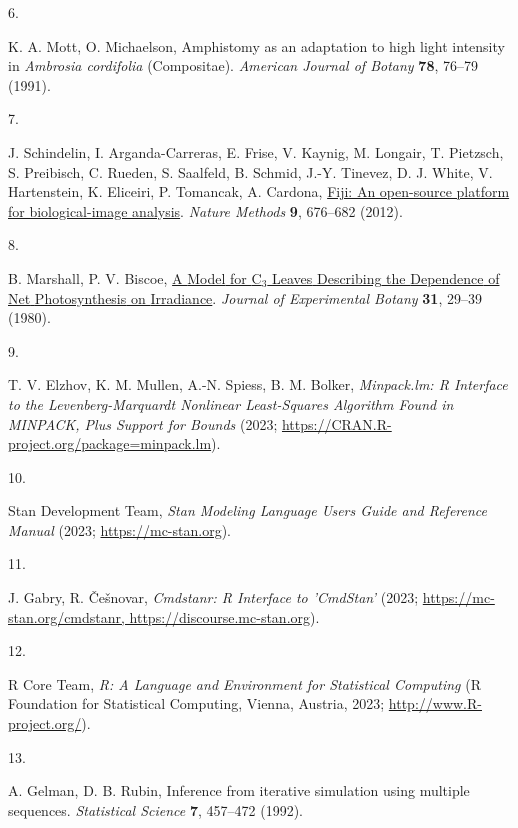 \documentclass[
  letterpaper,
  DIV=11,
  numbers=noendperiod]{scrartcl}
\newlength{\cslhangindent}
\newlength{\csllabelwidth}
\newenvironment{CSLReferences}[2] %
 {\begin{list}{}{%
  \setlength{\itemindent}{0pt}
  \setlength{\leftmargin}{0pt}
  \setlength{\parsep}{0pt}
  \ifodd #1
   \setlength{\leftmargin}{\cslhangindent}
   \setlength{\itemindent}{-1\cslhangindent}
  \fi
  \setlength{\itemsep}{#2\baselineskip}}}
 {\end{list}}
\newcommand{\CSLLeftMargin}[1]{\parbox[t]{\csllabelwidth}{\strut#1\strut}}
\newcommand{\CSLRightInline}[1]{\parbox[t]{\linewidth - \csllabelwidth}{\strut#1\strut}}
\begin{document}
\begin{CSLReferences}{0}{1}
\CSLLeftMargin{6. }%
\CSLRightInline{K. A. Mott, O. Michaelson, Amphistomy as an adaptation
to high light intensity in \emph{{Ambrosia} cordifolia} ({Compositae}).
\emph{American Journal of Botany} \textbf{78}, 76--79 (1991).}

\CSLLeftMargin{7. }%
\CSLRightInline{J. Schindelin, I. Arganda-Carreras, E. Frise, V. Kaynig,
M. Longair, T. Pietzsch, S. Preibisch, C. Rueden, S. Saalfeld, B.
Schmid, J.-Y. Tinevez, D. J. White, V. Hartenstein, K. Eliceiri, P.
Tomancak, A. Cardona, \href{https://doi.org/10.1038/nmeth.2019}{Fiji: An
open-source platform for biological-image analysis}. \emph{Nature
Methods} \textbf{9}, 676--682 (2012).}

\CSLLeftMargin{8. }%
\CSLRightInline{B. Marshall, P. V. Biscoe,
\href{https://doi.org/10.1093/jxb/31.1.29}{A {Model} for
{C}\(_{\textrm{3}}\) {Leaves} {Describing} the {Dependence} of {Net}
{Photosynthesis} on {Irradiance}}. \emph{Journal of Experimental Botany}
\textbf{31}, 29--39 (1980).}

\CSLLeftMargin{9. }%
\CSLRightInline{T. V. Elzhov, K. M. Mullen, A.-N. Spiess, B. M. Bolker,
\emph{Minpack.lm: {R} {Interface} to the {Levenberg}-{Marquardt}
{Nonlinear} {Least}-{Squares} {Algorithm} {Found} in {MINPACK}, {Plus}
{Support} for {Bounds}} (2023;
\url{https://CRAN.R-project.org/package=minpack.lm}).}

\CSLLeftMargin{10. }%
\CSLRightInline{Stan Development Team, \emph{Stan {Modeling} {Language}
{Users} {Guide} and {Reference} {Manual}} (2023;
\url{https://mc-stan.org}).}

\CSLLeftMargin{11. }%
\CSLRightInline{J. Gabry, R. Češnovar, \emph{Cmdstanr: {R} {Interface}
to '{CmdStan}'} (2023;
\href{https://mc-stan.org/cmdstanr,\%20https://discourse.mc-stan.org}{https://mc-stan.org/cmdstanr,
https://discourse.mc-stan.org}).}

\CSLLeftMargin{12. }%
\CSLRightInline{R Core Team, \emph{R: {A} {Language} and {Environment}
for {Statistical} {Computing}} (R Foundation for Statistical Computing,
Vienna, Austria, 2023; \url{http://www.R-project.org/}).}

\CSLLeftMargin{13. }%
\CSLRightInline{A. Gelman, D. B. Rubin, Inference from iterative
simulation using multiple sequences. \emph{Statistical Science}
\textbf{7}, 457--472 (1992).}


\end{CSLReferences}
\end{document}
